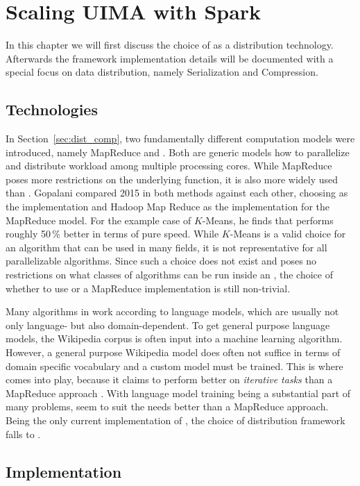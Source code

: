 \chapter{Scaling UIMA with Spark}
\label{ch:implementation}
In this chapter we will first discuss the choice of \spark{} as a distribution technology. Afterwards the framework implementation details will be documented with a special focus on data distribution, namely Serialization and Compression.
\section{Technologies}
In Section~\ref{sec:dist_comp}, two fundamentally different computation models were introduced, namely MapReduce and \rdds{}. Both are generic models how to parallelize and distribute workload among multiple processing cores. While MapReduce poses more restrictions on the underlying function, it is also more widely used than \rdds{}. Gopalani compared 2015 in \cite{gopalani2015comparing} both methods against each other, choosing \spark{} as the \rdd{} implementation and Hadoop Map Reduce as the implementation for the MapReduce model. For the example case of $K$-Means, he finds that \spark{} performs roughly 50\,\% better in terms of pure speed. While $K$-Means is a valid choice for an algorithm that can be used in many fields, it is not representative for all parallelizable algorithms. Since such a choice does not exist and \uima{} poses no restrictions on what classes of algorithms can be run inside an \anen{}, the choice of whether to use \rdds{} or a MapReduce implementation is still non-trivial.

Many algorithms in \nlp{} work according to language models, which are usually not only language- but also domain-dependent. To get general purpose language models, the Wikipedia corpus is often input into a machine learning algorithm. However, a general purpose Wikipedia model does often not suffice in terms of domain specific vocabulary and a custom model must be trained. This is where \spark{} comes into play, because it claims to perform better on \emph{iterative tasks} than a MapReduce approach \cite{willmapreduce}. With language model training being a substantial part of many \nlp{} problems, \rdds{} seem to suit the \nlp{} needs better than a MapReduce approach. Being the only current implementation of \rdds{}, the choice of distribution framework falls to \spark{}.
\section{Implementation}


